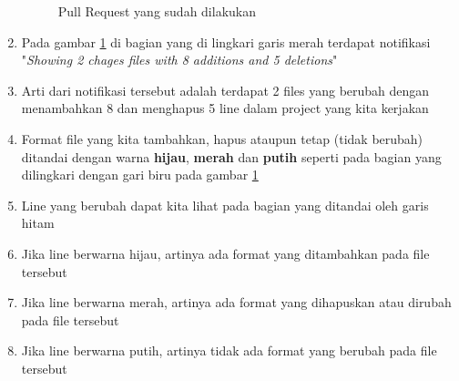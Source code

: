 \begin{enumerate}
\begin{figure}[!htbp]
\caption{Pull Request yang sudah dilakukan}
\label{fig:line}
\end{figure}
\item Pada gambar \ref{fig:line} di bagian yang di lingkari garis merah terdapat notifikasi "\textit{Showing 2 chages files with 8 additions and 5 deletions}"
\item Arti dari notifikasi tersebut adalah terdapat 2 files yang berubah dengan menambahkan 8 dan menghapus 5 line dalam project yang kita kerjakan
\item Format file yang kita tambahkan, hapus ataupun tetap (tidak berubah) ditandai dengan warna \textbf{hijau}, \textbf{merah} dan \textbf{putih} seperti pada bagian yang dilingkari dengan gari biru pada gambar \ref{fig:line}
\item Line yang berubah dapat kita lihat pada bagian yang ditandai oleh garis hitam
\item Jika line berwarna hijau, artinya ada format yang ditambahkan pada file tersebut
\item Jika line berwarna merah, artinya ada format yang dihapuskan atau dirubah pada file tersebut
\item Jika line berwarna putih, artinya tidak ada format yang berubah pada file tersebut
\end{enumerate}

